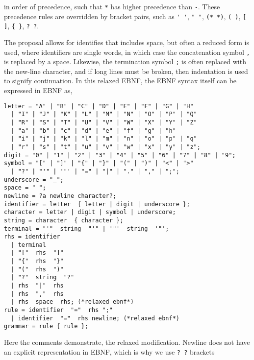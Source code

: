in order of precedence, such that \lstinline[language=ebnf]{*} has higher precedence than \lstinline[language=ebnf]{-}. These precedence rules are overridden by bracket pairs, such as \lstinline[language=ebnf]{' '}, \lstinline[language=ebnf]{" "}, \lstinline[language=ebnf]{(* *)}, \lstinline[language=ebnf]{( )}, \lstinline[language=ebnf]{[ ]}, \lstinline[language=ebnf]!{ }!, \lstinline{? ?}.

The proposal allows for identifies that includes space, but often a reduced form is used, where identifiers are single words, in which case the concatenation symbol \lstinline[language=ebnf]|,| is replaced by a space. Likewise, the termination symbol \lstinline[language=ebnf]|;| is often replaced with the new-line character, and if long lines must be broken, then indentation is used to signify continuation. In this relaxed EBNF, the EBNF syntax itself can be expressed in EBNF as,
\begin{lstlisting}[language=ebnf]
letter = "A" | "B" | "C" | "D" | "E" | "F" | "G" | "H" 
  | "I" | "J" | "K" | "L" | "M" | "N" | "O" | "P" | "Q" 
  | "R" | "S" | "T" | "U" | "V" | "W" | "X" | "Y" | "Z"
  | "a" | "b" | "c" | "d" | "e" | "f" | "g" | "h" 
  | "i" | "j" | "k" | "l" | "m" | "n" | "o" | "p" | "q" 
  | "r" | "s" | "t" | "u" | "v" | "w" | "x" | "y" | "z";
digit = "0" | "1" | "2" | "3" | "4" | "5" | "6" | "7" | "8" | "9";
symbol = "[" | "]" | "{" | "}" | "(" | ")" | "<" | ">"
  | "?" | "'" | '"' | "=" | "|" | "." | "," | ";";
underscore = "_";
space = " ";
newline = ?a newline character?;
identifier = letter  { letter | digit | underscore };
character = letter | digit | symbol | underscore; 
string = character  { character };
terminal = "'"  string  "'" | '"'  string  '"';
rhs = identifier
  | terminal
  | "["  rhs  "]"
  | "{"  rhs  "}"
  | "("  rhs  ")"
  | "?"  string  "?"
  | rhs  "|"  rhs
  | rhs  ","  rhs
  | rhs  space  rhs; (*relaxed ebnf*)
rule = identifier  "="  rhs ";"
  | identifier  "="  rhs newline; (*relaxed ebnf*)
grammar = rule { rule };
\end{lstlisting}
Here the comments demonstrate, the relaxed modification. Newline does not have an explicit representation in EBNF, which is why we use \lstinline[language=ebnf]{? ?} brackets

